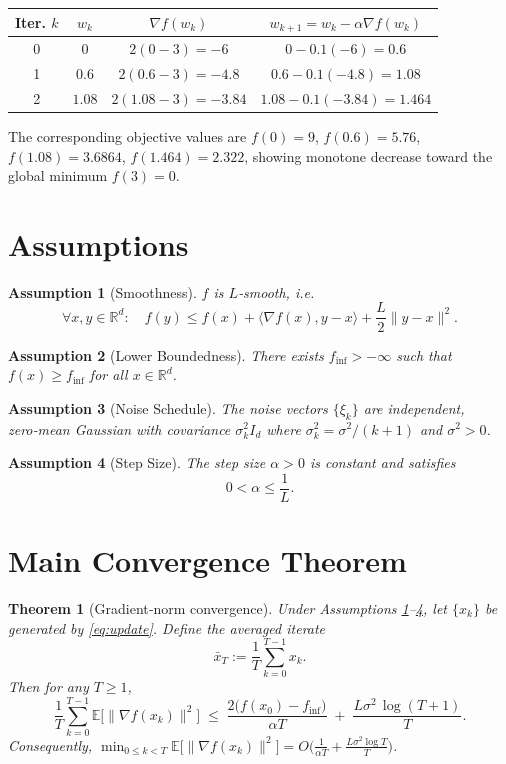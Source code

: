\documentclass{article}
\newtheorem{theorem}{Theorem}
\newtheorem{assumption}{Assumption}
\newcommand{\E}{\mathbb{E}}
\newcommand{\R}{\mathbb{R}}
\begin{document}
\begin{center}
\begin{tabular}{c|c|c|c}
\textbf{Iter.} $k$ & $w_{k}$ & $\nabla f(w_{k})$ & $w_{k+1}=w_{k}-\alpha\nabla f(w_{k})$ \\ \hline
0 & $0$ & $2(0-3)=-6$ & $0-0.1(-6)=0.6$ \\[2mm]
1 & $0.6$ & $2(0.6-3)=-4.8$ & $0.6-0.1(-4.8)=1.08$ \\[2mm]
2 & $1.08$ & $2(1.08-3)=-3.84$ & $1.08-0.1(-3.84)=1.464$ \\[2mm]
\end{tabular}
\end{center}
The corresponding objective values are $f(0)=9$, $f(0.6)=5.76$, $f(1.08)=3.6864$, $f(1.464)=2.322$, showing monotone decrease toward the global minimum $f(3)=0$.

\newpage
\section*{Assumptions}
\begin{assumption}[Smoothness]\label{as:smooth}
$f$ is $L$‑smooth, i.e.
\[
\forall x,y\in\R^{d}:\quad 
f(y)\le f(x)+\langle\nabla f(x),y-x\rangle+\frac{L}{2}\|y-x\|^{2}.
\]
\end{assumption}
\begin{assumption}[Lower Boundedness]\label{as:lb}
There exists $f_{\inf}>-\infty$ such that $f(x)\ge f_{\inf}$ for all $x\in\R^{d}$.
\end{assumption}
\begin{assumption}[Noise Schedule]\label{as:noise}
The noise vectors $\{\xi_{k}\}$ are independent, zero‑mean Gaussian with covariance $\sigma_{k}^{2}I_{d}$ where $\sigma_{k}^{2}= \sigma^{2}/(k+1)$ and $\sigma^{2}>0$.
\end{assumption}
\begin{assumption}[Step Size]\label{as:step}
The step size $\alpha>0$ is constant and satisfies 
\[
0<\alpha\le \frac{1}{L}.
\]
\end{assumption}

\section*{Main Convergence Theorem}
\begin{theorem}[Gradient‑norm convergence]\label{thm:main}
Under Assumptions \ref{as:smooth}–\ref{as:step}, let $\{x_{k}\}$ be generated by \eqref{eq:update}. Define the averaged iterate
\[
\bar x_{T}:=\frac{1}{T}\sum_{k=0}^{T-1}x_{k}.
\]
Then for any $T\ge 1$,
\begin{equation}
\frac{1}{T}\sum_{k=0}^{T-1}\E\!\bigl[\|\nabla f(x_{k})\|^{2}\bigr]
\;\le\;
\frac{2\bigl(f(x_{0})-f_{\inf}\bigr)}{\alpha T}
\;+\;
\frac{L\sigma^{2}\,\log (T+1)}{T}. \label{eq:rate}
\end{equation}
Consequently, $\displaystyle \min_{0\le k<T}\E\!\bigl[\|\nabla f(x_{k})\|^{2}\bigr]=O\!\bigl(\tfrac{1}{\alpha T}+\tfrac{L\sigma^{2}\log T}{T}\bigr)$.
\end{theorem}
\end{document}
